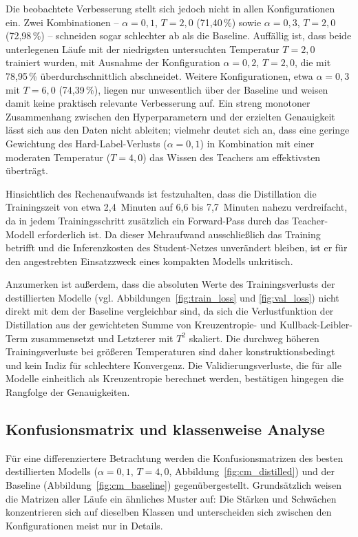 Die beobachtete Verbesserung stellt sich jedoch nicht in allen Konfigurationen ein. Zwei Kombinationen --
$\alpha = 0{,}1$, $T = 2{,}0$ (71{,}40\,\%) sowie $\alpha = 0{,}3$, $T = 2{,}0$ (72{,}98\,\%) -- schneiden sogar
schlechter ab als die Baseline. Auffällig ist, dass beide unterlegenen Läufe mit der niedrigsten untersuchten
Temperatur $T = 2{,}0$ trainiert wurden, mit Ausnahme der Konfiguration $\alpha = 0{,}2$, $T = 2{,}0$, die mit
78{,}95\,\% überdurchschnittlich abschneidet. Weitere Konfigurationen, etwa $\alpha = 0{,}3$ mit $T = 6{,}0$
(74{,}39\,\%), liegen nur unwesentlich über der Baseline und weisen damit keine praktisch relevante Verbesserung auf.
Ein streng monotoner Zusammenhang zwischen den Hyperparametern und der erzielten Genauigkeit lässt sich aus den Daten
nicht ableiten; vielmehr deutet sich an, dass eine geringe Gewichtung des Hard-Label-Verlusts ($\alpha = 0{,}1$) in
Kombination mit einer moderaten Temperatur ($T = 4{,}0$) das Wissen des Teachers am effektivsten überträgt.
 
Hinsichtlich des Rechenaufwands ist festzuhalten, dass die Distillation die Trainingszeit von etwa 2{,}4~Minuten
auf 6{,}6 bis 7{,}7~Minuten nahezu verdreifacht, da in jedem Trainingsschritt zusätzlich ein Forward-Pass durch das
Teacher-Modell erforderlich ist. Da dieser Mehraufwand ausschließlich das Training betrifft und die Inferenzkosten des
Student-Netzes unverändert bleiben, ist er für den angestrebten Einsatzzweck eines kompakten Modells unkritisch.
 
Anzumerken ist außerdem, dass die absoluten Werte des Trainingsverlusts der destillierten Modelle
(vgl. Abbildungen~\ref{fig:train_loss} und \ref{fig:val_loss}) nicht direkt mit dem der Baseline vergleichbar sind, da sich die Verlustfunktion
der Distillation aus der gewichteten Summe von Kreuzentropie- und Kullback-Leibler-Term zusammensetzt und Letzterer
mit $T^2$ skaliert. Die durchweg höheren Trainingsverluste bei größeren Temperaturen sind daher konstruktionsbedingt
und kein Indiz für schlechtere Konvergenz. Die Validierungsverluste, die für alle Modelle einheitlich als Kreuzentropie
berechnet werden, bestätigen hingegen die Rangfolge der Genauigkeiten.
 
\subsection{Konfusionsmatrix und klassenweise Analyse}
 
Für eine differenziertere Betrachtung werden die Konfusionsmatrizen des besten destillierten Modells 
($\alpha = 0{,}1$, $T = 4{,}0$, Abbildung~\ref{fig:cm_distilled}) und der Baseline (Abbildung~\ref{fig:cm_baseline}) 
gegenübergestellt. Grundsätzlich weisen die Matrizen aller Läufe ein ähnliches Muster auf: Die Stärken und Schwächen 
konzentrieren sich auf dieselben Klassen und unterscheiden sich zwischen den Konfigurationen meist nur in Details.
 
